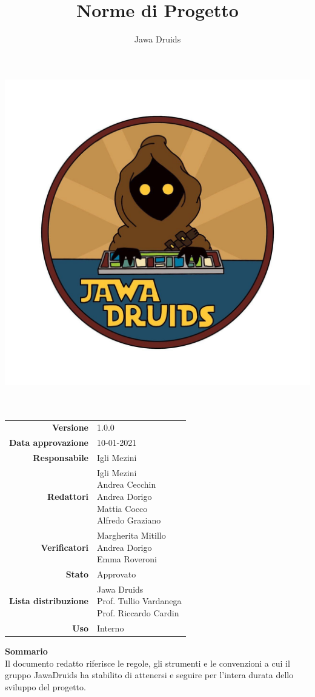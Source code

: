 



\makeatletter
\begin{titlepage}
	\begin{center}
		\vspace*{-4cm}
		\author{Jawa Druids} 
		\title{Norme di Progetto}
		\date{} %
		\includegraphics[width=0.5\linewidth]{../immagini/DRUIDSLOGO.jpg}\\[4ex]
		{\huge \bfseries  \@title }\\[2ex] 
		{\LARGE  \@author}\\[50ex]
		\vspace*{-9cm}
		\begin{table}[H]
			\renewcommand{\arraystretch}{1.4}
			\centering
			\begin{tabular}{r | l}
				\textbf{Versione} & 1.0.0 \\%
				\textbf{Data approvazione} & 10-01-2021\\
				\textbf{Responsabile} & Igli Mezini \\
				\textbf{Redattori} & \makecell[tl]{Igli Mezini \\ Andrea Cecchin \\ Andrea Dorigo \\ Mattia Cocco \\ Alfredo Graziano} \\		
				\textbf{Verificatori} & \makecell[tl]{Margherita Mitillo \\ Andrea Dorigo \\ Emma Roveroni} \\
				\textbf{Stato} & Approvato\\
				\textbf{Lista distribuzione} & \makecell[tl]{Jawa Druids \\ Prof. Tullio Vardanega \\ Prof. Riccardo Cardin}\\
				\textbf{Uso} & Interno     
			\end{tabular}
		\end{table}
		\vspace{0.1cm}
		\hfill \break
		\fontsize{17}{10}\textbf{Sommario} \\
		\vspace{0.1cm}
		Il documento redatto riferisce le regole, gli strumenti e le convenzioni a cui il gruppo JawaDruids ha stabilito di attenersi e seguire per l'intera durata dello sviluppo del progetto.
	\end{center}
\end{titlepage}
